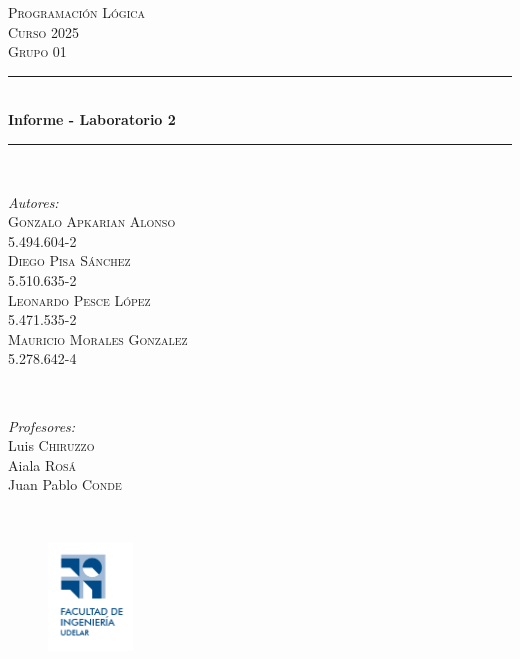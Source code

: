 \documentclass[12pt]{article} %
\begin{document}
	\begin{titlepage}
		\newcommand{\HRule}{\rule{\linewidth}{0.5mm}} %
		
		\center %
		
		\textsc{\LARGE Programación Lógica}\\[1.5cm] %
		\textsc{\Large Curso 2025}\\[0.5cm] %
		\textsc{\large Grupo 01}\\[0.5cm] %
		
		\HRule \\[0.4cm]
		{\huge \bfseries Informe - Laboratorio 2}\\[0.4cm] %
		\HRule \\[1cm]
		
		\begin{minipage}{0.4\textwidth}
			\begin{flushleft} \large
				\emph{Autores:}\\
				\textsc{Gonzalo Apkarian Alonso \\ 5.494.604-2}\\ %
				\textsc{Diego Pisa Sánchez \\ 5.510.635-2}\\ %
				\textsc{Leonardo Pesce López \\ 5.471.535-2}\\
				\textsc{Mauricio Morales Gonzalez \\ 5.278.642-4}
			\end{flushleft}
		\end{minipage}
		~
		\begin{minipage}{0.4\textwidth}
			\begin{flushright} \large
				\emph{Profesores:} \\ 
				Luis \textsc{Chiruzzo} \\ 
				Aiala \textsc{Rosá} \\ 
				Juan Pablo \textsc{Conde}
			\end{flushright}
		\end{minipage}\\[3cm]
		
		\begin{figure}[H]
			\centering
			\includegraphics[width=0.2\textwidth]{logo.png} %
			\label{fig:logo}
		\end{figure}
		

\end{titlepage}
\end{document}
